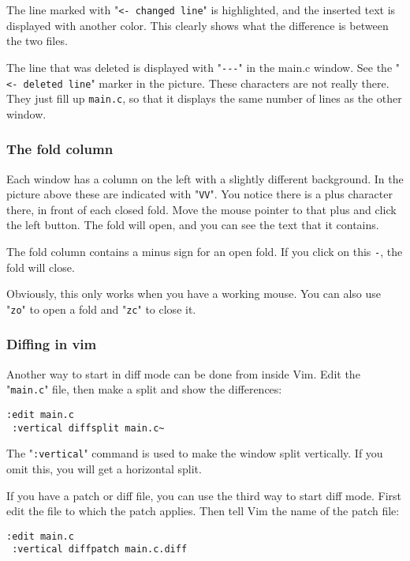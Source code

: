 The line marked with "\verb!<- changed line!" is highlighted, and the inserted text is displayed with another color.
This clearly shows what the difference is between the two files.

The line that was deleted is displayed with "\verb!---!" in the main.c window.
See the "\verb!<- deleted line!" marker in the picture.
These characters are not really there.
They just fill up \verb!main.c!, so that it displays the same number of lines as the other window.

\subsubsection{The fold column}
Each window has a column on the left with a slightly different background.
In the picture above these are indicated with "\verb!VV!".
You notice there is a plus character there, in front of each closed fold.
Move the mouse pointer to that plus and click the left button.
The fold will open, and you can see the text that it contains.

The fold column contains a minus sign for an open fold.
If you click on this \verb!-!, the fold will close.

Obviously, this only works when you have a working mouse.
You can also use "\verb!zo!" to open a fold and "\verb!zc!" to close it.

\subsubsection{Diffing in vim}
Another way to start in diff mode can be done from inside Vim.
Edit the "\verb!main.c!" file, then make a split and show the differences:

 \begin{Verbatim}[samepage=true]
 :edit main.c
 :vertical diffsplit main.c~ 
 \end{Verbatim}

The "\verb!:vertical!" command is used to make the window split vertically.
If you omit this, you will get a horizontal split.

If you have a patch or diff file, you can use the third way to start diff mode.
First edit the file to which the patch applies.
Then tell Vim the name of the patch file:

 \begin{Verbatim}[samepage=true]
 :edit main.c
 :vertical diffpatch main.c.diff
 \end{Verbatim}

